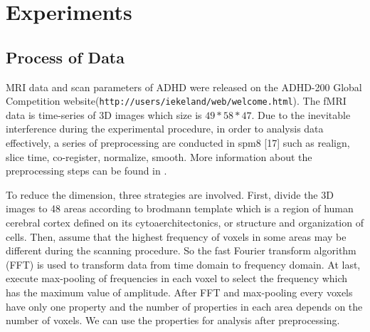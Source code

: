 \documentclass{llncs}
\begin{document}
\section{Experiments}
\subsection{Process of Data}
MRI data and scan parameters of ADHD were released on the ADHD-200 Global Competition website(\texttt{http://users/\homedir iekeland/web/welcome.html}). The fMRI data is time-series of 3D images which size is $49*58*47$. Due to the inevitable interference during the experimental procedure, in order to analysis data effectively, a series of preprocessing are conducted in spm8 [17] such as realign, slice time, co-register, normalize, smooth. More information about the preprocessing steps can be found in \cite{18}.


To reduce the dimension, three strategies are involved. First, divide the 3D images to 48 areas according to brodmann template which is a region of human cerebral cortex defined on its cytoaerchitectonics, or structure and organization of cells. Then, assume that the highest frequency of voxels in some areas may be different during the scanning procedure. So the fast Fourier transform algorithm (FFT) is used to transform data from time domain to frequency domain. At last, execute max-pooling of frequencies in each voxel to select the frequency which has the maximum value of amplitude. After FFT and max-pooling every voxels have only one property and the number of properties in each area depends on the number of voxels. We can use the properties for analysis after preprocessing.
\end{document}
